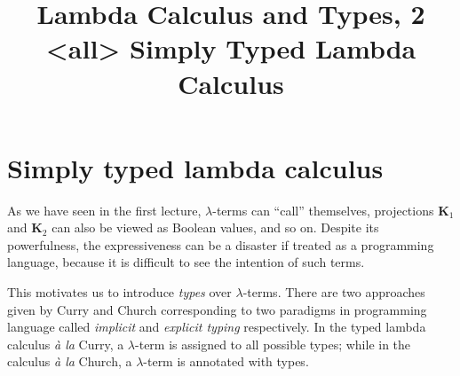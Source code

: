 \title{Lambda Calculus and Types, 2 \\<all>
  Simply Typed Lambda Calculus}

\begin{frame}
\maketitle
\end{frame}

\section{Simply typed lambda calculus}
As we have seen in the first lecture, $\lambda$-terms can ``call'' themselves,
projections $\mathbf{K}_1$ and $\mathbf{K}_2$ can also be viewed as Boolean
values, and so on. Despite its powerfulness, the expressiveness can be a
disaster if treated as a programming language, because it is difficult to see the
intention of such terms. 

This motivates us to introduce \emph{types} over $\lambda$-terms. There are two
approaches given by Curry and Church corresponding to
two paradigms in programming language called \emph{implicit} and \emph{explicit
  typing} respectively.  In the typed lambda calculus \textit{\`a la} Curry, a
$\lambda$-term is assigned to all possible types; while in the calculus
\textit{\`a la} Church, a $\lambda$-term is annotated with types. 


